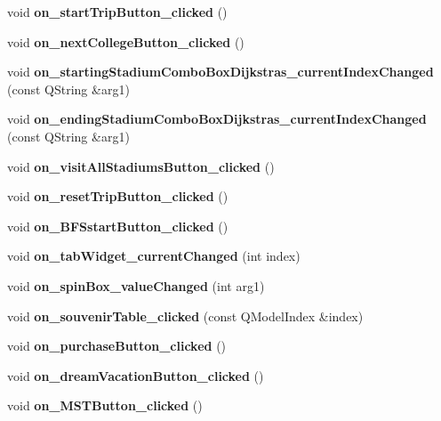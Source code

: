 \begin{DoxyCompactItemize}
\item 
\mbox{\label{class_main_window_a1b0a71532f0f5e71a92907ecc66276ba}} 
void {\bfseries on\+\_\+start\+Trip\+Button\+\_\+clicked} ()
\item 
\mbox{\label{class_main_window_a04ec468348571e9dd5c3cdc0a34cd590}} 
void {\bfseries on\+\_\+next\+College\+Button\+\_\+clicked} ()
\item 
\mbox{\label{class_main_window_a48febb3456f23f978d69b6d1a0bd1676}} 
void {\bfseries on\+\_\+starting\+Stadium\+Combo\+Box\+Dijkstras\+\_\+current\+Index\+Changed} (const Q\+String \&arg1)
\item 
\mbox{\label{class_main_window_a8b38dc73a7ab40d56befb134d276e467}} 
void {\bfseries on\+\_\+ending\+Stadium\+Combo\+Box\+Dijkstras\+\_\+current\+Index\+Changed} (const Q\+String \&arg1)
\item 
\mbox{\label{class_main_window_a4e0e0ec958fcabd367a5094389b8d380}} 
void {\bfseries on\+\_\+visit\+All\+Stadiums\+Button\+\_\+clicked} ()
\item 
\mbox{\label{class_main_window_ad78a32b3aa8fae318e326a8a0f1ab9f5}} 
void {\bfseries on\+\_\+reset\+Trip\+Button\+\_\+clicked} ()
\item 
\mbox{\label{class_main_window_a78217438ec4b04b221c04a7b3d908469}} 
void {\bfseries on\+\_\+\+B\+F\+Sstart\+Button\+\_\+clicked} ()
\item 
\mbox{\label{class_main_window_ab5ec4a06e4e38781eb7b913fed92733e}} 
void {\bfseries on\+\_\+tab\+Widget\+\_\+current\+Changed} (int index)
\item 
\mbox{\label{class_main_window_ab563c0d9e0225b55585cbfdba998c3cc}} 
void {\bfseries on\+\_\+spin\+Box\+\_\+value\+Changed} (int arg1)
\item 
\mbox{\label{class_main_window_a1ca615293b8c2dbeef99dbf61e82bb55}} 
void {\bfseries on\+\_\+souvenir\+Table\+\_\+clicked} (const Q\+Model\+Index \&index)
\item 
\mbox{\label{class_main_window_a1a7f2c3750064fcfc2af7b82e6e1f649}} 
void {\bfseries on\+\_\+purchase\+Button\+\_\+clicked} ()
\item 
\mbox{\label{class_main_window_aea2558859c02d5d8526863c8d3a1c272}} 
void {\bfseries on\+\_\+dream\+Vacation\+Button\+\_\+clicked} ()
\item 
\mbox{\label{class_main_window_a1d1b4ddc9165c7c0b8b4621cca3318a0}} 
void {\bfseries on\+\_\+\+M\+S\+T\+Button\+\_\+clicked} ()
\end{DoxyCompactItemize}
